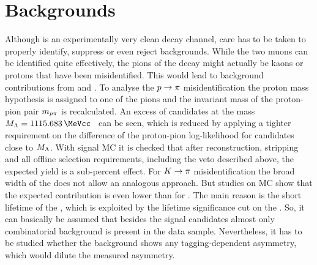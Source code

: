 
\section{Backgrounds}
\label{sec:bd2jpsiks:backgrounds}

Although \BdToJPsiKS is an experimentally very clean decay channel, care has to
be taken to properly identify, suppress or even reject backgrounds. While the
two muons can be identified quite effectively, the pions of the \KS decay might
actually be kaons or protons that have been misidentified. This would lead
to background contributions from \BdToJPsiKst and \LbToJPsiL. To analyse the
\mbox{${p} \rightarrow {\ensuremath{\pi}}$} misidentification the proton mass hypothesis is assigned to one of
the pions and the invariant mass of the proton-pion pair $m_{{p}{\pi}}$ is
recalculated. An excess of candidates at the \Lz mass $M_{\Lz} =
\SI{1115.683}{\MeVcc}$~\cite{PDG2014} can be seen, which is reduced by applying
a tighter requirement on the difference of the proton-pion log-likelihood for
candidates close to $M_{{\Lambda}}$. With \LbToJPsiL signal MC it is checked that
after reconstruction, stripping and all offline selection requirements,
including the veto described above, the expected yield is a sub-percent
effect. For \mbox{${K} \rightarrow {\ensuremath{\pi}}$} misidentification the broad width of the \Kstarz does not
allow an analogous approach. But studies on \BdToJPsiKst MC show that the
expected contribution is even lower than for \LbToJPsiL. The main reason is
the short lifetime of the \Kstarz, which is exploited by the lifetime
significance cut on the \KS. So, it can basically be assumed that besides the
signal candidates almost only combinatorial background is present in the data
sample. Nevertheless, it has to be studied whether the background shows any
tagging-dependent asymmetry, which would dilute the measured \CP asymmetry.

